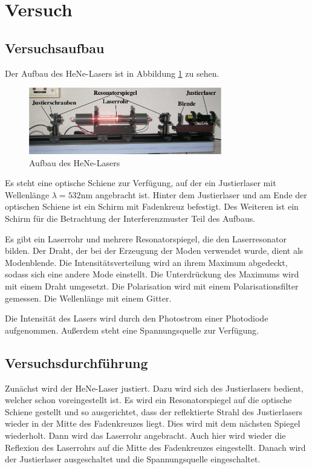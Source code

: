 \section{Versuch}
\subsection{Versuchsaufbau}
Der Aufbau des HeNe-Lasers ist in Abbildung \ref{fig:hene2} zu sehen.

\begin{figure}
	\centering
	\includegraphics[width=0.75\textwidth]{img/hene2}
	\caption{Aufbau des HeNe-Lasers \cite{V61}}
	\label{fig:hene2}
\end{figure}

\noindent Es steht eine optische Schiene zur Verfügung, auf der ein Justierlaser mit Wellenlänge \(\lambda=532\)nm angebracht ist. Hinter dem Justierlaser und am Ende der optischen Schiene ist ein Schirm mit Fadenkreuz befestigt. Des Weiteren ist ein Schirm für die Betrachtung der Interferenzmuster Teil des Aufbaus.

\noindent Es gibt ein Laserrohr und mehrere Resonatorspiegel, die den Laserresonator bilden. Der Draht, der bei der Erzeugung der Moden verwendet wurde, dient als Modenblende. Die Intensitätsverteilung wird an ihrem Maximum abgedeckt, sodass sich eine andere Mode einstellt. Die Unterdrückung des Maximums wird mit einem Draht umgesetzt. Die Polarisation wird mit einem Polarisationsfilter gemessen. Die Wellenlänge mit einem Gitter.

\noindent Die Intensität des Lasers wird durch den Photostrom einer Photodiode aufgenommen. Außerdem steht eine Spannungsquelle zur Verfügung.

\subsection{Versuchsdurchführung}
Zunächst wird der HeNe-Laser justiert. Dazu wird sich des Justierlasers bedient, welcher schon voreingestellt ist. Es wird ein Resonatorspiegel auf die optische Schiene gestellt und so ausgerichtet, dass der reflektierte Strahl des Justierlasers wieder in der Mitte des Fadenkreuzes liegt. Dies wird mit dem nächsten Spiegel wiederholt. Dann wird das Laserrohr angebracht. Auch hier wird wieder die Reflexion des Laserrohrs auf die Mitte des Fadenkreuzes eingestellt. Danach wird der Justierlaser ausgeschaltet und die Spannungsquelle eingeschaltet.

